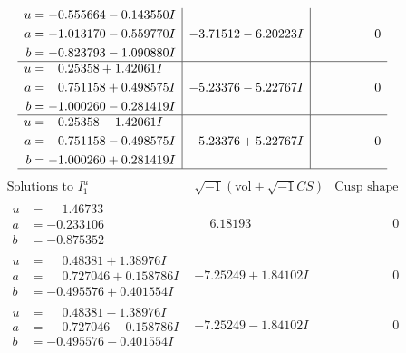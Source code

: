 \documentclass[1p]{elsarticle_modified}
\theoremstyle{definition}
\newcommand{\I}{\sqrt{-1}}
\begin{document}
$$\begin{array}{c|c|c}
\begin{aligned}
u &= -0.555664 - 0.143550 I \\
a &= -1.013170 - 0.559770 I \\
b &= -0.823793 - 1.090880 I\end{aligned}
 & -3.71512 - 6.20223 I & \phantom{-0.000000 } 0 \\ \hline\begin{aligned}
u &= \phantom{-}0.25358 + 1.42061 I \\
a &= \phantom{-}0.751158 + 0.498575 I \\
b &= -1.000260 - 0.281419 I\end{aligned}
 & -5.23376 - 5.22767 I & \phantom{-0.000000 } 0 \\ \hline\begin{aligned}
u &= \phantom{-}0.25358 - 1.42061 I \\
a &= \phantom{-}0.751158 - 0.498575 I \\
b &= -1.000260 + 0.281419 I\end{aligned}
 & -5.23376 + 5.22767 I & \phantom{-0.000000 } 0\\
 \hline 
 \end{array}$$\newpage$$\begin{array}{c|c|c}  
\text{Solutions to }I^u_{1}& \I (\text{vol} + \sqrt{-1}CS) & \text{Cusp shape}\\
 \hline 
\begin{aligned}
u &= \phantom{-}1.46733\phantom{ +0.000000I} \\
a &= -0.233106\phantom{ +0.000000I} \\
b &= -0.875352\phantom{ +0.000000I}\end{aligned}
 & \phantom{-}6.18193\phantom{ +0.000000I} & \phantom{-0.000000 } 0 \\ \hline\begin{aligned}
u &= \phantom{-}0.48381 + 1.38976 I \\
a &= \phantom{-}0.727046 + 0.158786 I \\
b &= -0.495576 + 0.401554 I\end{aligned}
 & -7.25249 + 1.84102 I & \phantom{-0.000000 } 0 \\ \hline\begin{aligned}
u &= \phantom{-}0.48381 - 1.38976 I \\
a &= \phantom{-}0.727046 - 0.158786 I \\
b &= -0.495576 - 0.401554 I\end{aligned}
 & -7.25249 - 1.84102 I & \phantom{-0.000000 } 0 \\ \hline\begin{aligned}

\end{aligned}
\end{array}$$
\end{document}
